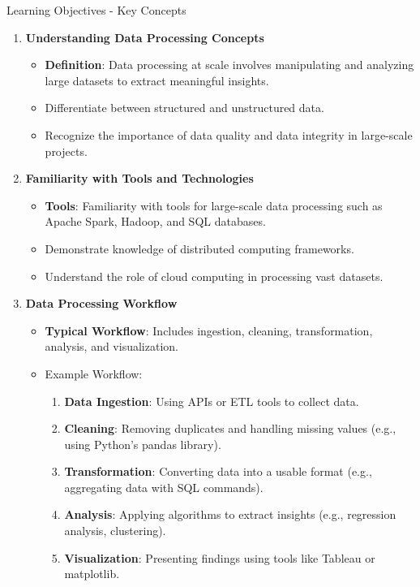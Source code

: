 \documentclass[aspectratio=169]{beamer}
\begin{document}
\begin{frame}[fragile]{Learning Objectives - Key Concepts}
    \begin{enumerate}
        \item \textbf{Understanding Data Processing Concepts}
            \begin{itemize}
                \item \textbf{Definition}: Data processing at scale involves manipulating and analyzing large datasets to extract meaningful insights.
                \item Differentiate between structured and unstructured data.
                \item Recognize the importance of data quality and data integrity in large-scale projects.
            \end{itemize}
        
        \item \textbf{Familiarity with Tools and Technologies}
            \begin{itemize}
                \item \textbf{Tools}: Familiarity with tools for large-scale data processing such as Apache Spark, Hadoop, and SQL databases.
                \item Demonstrate knowledge of distributed computing frameworks.
                \item Understand the role of cloud computing in processing vast datasets.
            \end{itemize}
        
        \item \textbf{Data Processing Workflow}
            \begin{itemize}
                \item \textbf{Typical Workflow}: Includes ingestion, cleaning, transformation, analysis, and visualization.
                \item Example Workflow:
                    \begin{enumerate}
                        \item \textbf{Data Ingestion}: Using APIs or ETL tools to collect data.
                        \item \textbf{Cleaning}: Removing duplicates and handling missing values (e.g., using Python’s pandas library).
                        \item \textbf{Transformation}: Converting data into a usable format (e.g., aggregating data with SQL commands).
                        \item \textbf{Analysis}: Applying algorithms to extract insights (e.g., regression analysis, clustering).
                        \item \textbf{Visualization}: Presenting findings using tools like Tableau or matplotlib.
                    \end{enumerate}
            \end{itemize}
    \end{enumerate}
\end{frame}
\end{document}
